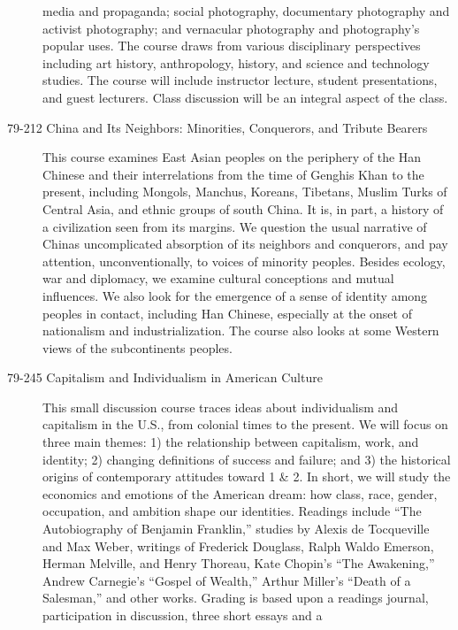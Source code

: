 \begin{description}
        media and propaganda; social photography, documentary photography and
        activist photography; and vernacular photography and photography's
        popular uses. The course draws from various disciplinary perspectives
        including art history, anthropology, history, and science and technology
        studies. The course will include instructor lecture, student
        presentations, and guest lecturers. Class discussion will be an integral
        aspect of the class.
    \item [79-212 China and Its Neighbors: Minorities, Conquerors, and Tribute
        Bearers] This course examines East Asian peoples on the periphery of the
        Han Chinese and their interrelations from the time of Genghis Khan to
        the present, including Mongols, Manchus, Koreans, Tibetans, Muslim Turks
        of Central Asia, and ethnic groups of south China. It is, in part, a
        history of a civilization seen from its margins. We question the usual
        narrative of Chinas uncomplicated absorption of its neighbors and
        conquerors, and pay attention, unconventionally, to voices of minority
        peoples. Besides ecology, war and diplomacy, we examine cultural
        conceptions and mutual influences. We also look for the emergence of a
        sense of identity among peoples in contact, including Han Chinese,
        especially at the onset of nationalism and industrialization. The course
        also looks at some Western views of the subcontinents peoples.
    \item [79-245 Capitalism and Individualism in American Culture] This small
        discussion course traces ideas about individualism and capitalism in the
        U.S., from colonial times to the present. We will focus on three main
        themes: 1) the relationship between capitalism, work, and identity; 2)
        changing definitions of success and failure; and 3) the historical
        origins of contemporary attitudes toward 1 \& 2. In short, we will study
        the economics and emotions of the American dream: how class, race,
        gender, occupation, and ambition shape our identities.  Readings include
        ``The Autobiography of Benjamin Franklin,'' studies by Alexis de
        Tocqueville and Max Weber, writings of Frederick Douglass, Ralph Waldo
        Emerson, Herman Melville, and Henry Thoreau, Kate Chopin's ``The
        Awakening,'' Andrew Carnegie's ``Gospel of Wealth,'' Arthur Miller's
        ``Death of a Salesman,'' and other works. Grading is based upon a
        readings journal, participation in discussion, three short essays and a

\end{description}
